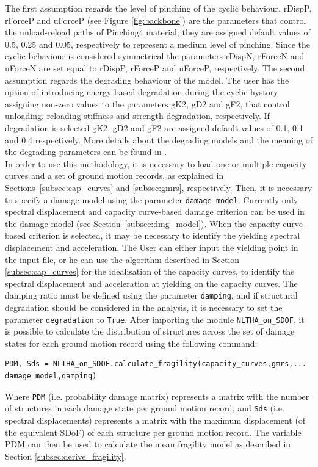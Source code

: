 The first assumption regards the level of pinching of the cyclic behaviour. rDispP, rForceP and uForceP (see Figure \ref{fig:backbone}) are the parameters that control the unload-reload paths of Pinching4 material; they are assigned default values of 0.5, 0.25 and 0.05, respectively to represent a medium level of pinching. Since the cyclic behaviour is considered symmetrical the parameters rDispN, rForceN and uForceN are set equal to rDispP, rForceP and uForceP, respectively. 
The second assumption regards the degrading behaviour of the model. The user has the option of introducing energy-based degradation during the cyclic hystory assigning non-zero values to the parameters gK2, gD2 and gF2, that control unloading, reloading stiffness and strength degradation, respectively. If degradation is selected gK2, gD2 and gF2 are assigned default values of 0.1, 0.1 and 0.4 respectively. More details about the degrading models and the meaning of the degrading parameters can be found in \citep{LowesEtAl2003}.\\

In order to use this methodology, it is necessary to load one or multiple capacity curves and a set of ground motion records, as explained in Sections~\ref{subsec:cap_curves} and \ref{subsec:gmrs}, respectively. Then, it is necessary to specify a damage model using the parameter \verb=damage_model=. Currently only spectral displacement and capacity curve-based  damage criterion can be used in the damage model (see Section~\ref{subsec:dmg_model}). When the capacity curve-based criterion is selected, it may be necessary to identify the yielding spectral displacement and acceleration. The User can either input the yielding point in the input file, or he can use the algorithm described in Section \ref{subsec:cap_curves} for the idealisation of the capacity curves, to identify the spectral displacement and acceleration at yielding on the capacity curves.
The damping ratio must be defined using the parameter \verb=damping=, and if structural degradation should be considered in the analysis, it is necessary to set the parameter \verb=degradation= to \verb=True=. After importing the module \verb=NLTHA_on_SDOF=, it is possible to calculate the distribution of structures across the set of damage states for each ground motion record using the following command:

\begin{Verbatim}[frame=single, commandchars=\\\{\}, samepage=true]
PDM, Sds = NLTHA_on_SDOF.calculate_fragility(capacity_curves,gmrs,...
damage_model,damping)
\end{Verbatim}

Where \verb=PDM= (i.e. probability damage matrix) represents a matrix with the number of structures in each damage state per ground motion record, and \verb=Sds= (i.e. spectral displacements) represents a matrix with the maximum displacement (of the equivalent SDoF) of each structure per ground motion record. The variable PDM can then be used to calculate the mean fragility model as described in Section \ref{subsec:derive_fragility}.